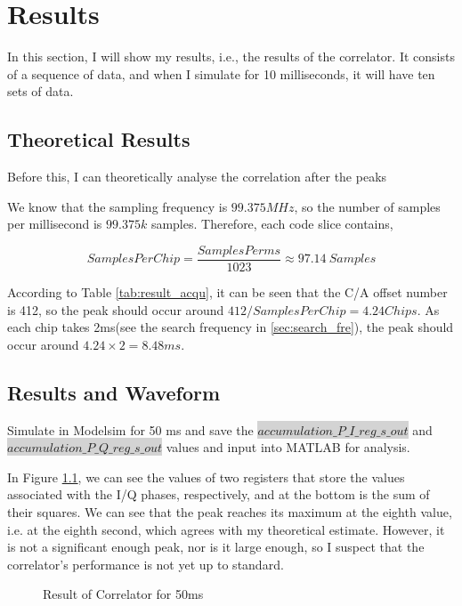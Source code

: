 \myClearDoublePage
\chapter{Results}
In this section, I will show my results, i.e., the results of the correlator. It consists of a sequence of data, and when I simulate for 10 milliseconds, it will have ten sets of data.

\section{Theoretical Results}
Before this, I can theoretically analyse the correlation after the peaks

We know that the sampling frequency is $99.375MHz$, so the number of samples per millisecond is $99.375k$ samples. Therefore, each code slice contains,

\begin{equation}
    SamplesPerChip=\frac{SamplesPerms}{1023} \approx 97.14\ Samples
\end{equation}

According to Table \ref{tab:result_acqu}, it can be seen that the C/A offset number is 412, so the peak should occur around $412/SamplesPerChip=4.24Chips$. As each chip takes 2ms(see the search frequency in \ref{sec:search_fre}), the peak should occur around $4.24\times 2=8.48ms$.

\section{Results and Waveform}
\label{sec:results_waveform}
Simulate in Modelsim for 50 ms and save the \colorbox{lightgray}{$accumulation\_P\_I\_reg\_s\_out$} and\\ \colorbox{lightgray}{$accumulation\_P\_Q\_reg\_s\_out$} values and input into MATLAB for analysis.

In Figure \ref{fig:result_50}, we can see the values of two registers that store the values associated with the I/Q phases, respectively, and at the bottom is the sum of their squares. We can see that the peak reaches its maximum at the eighth value, i.e. at the eighth second, which agrees with my theoretical estimate. However, it is not a significant enough peak, nor is it large enough, so I suspect that the correlator's performance is not yet up to standard.

\begin{figure}[!htbp]
    \centering
    
    \caption{Result of Correlator for 50ms}
    \label{fig:result_50}
\end{figure}

